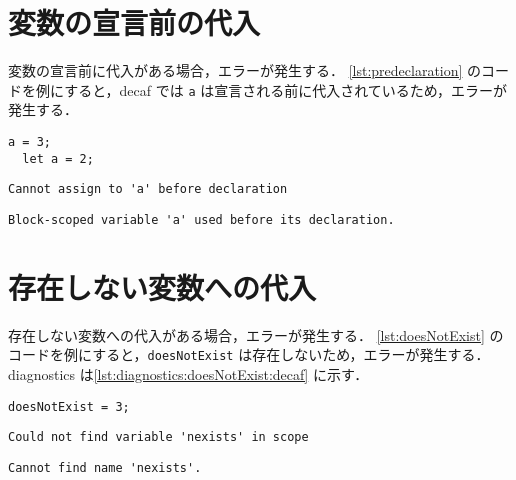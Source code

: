 \section{変数の宣言前の代入}

変数の宣言前に代入がある場合，エラーが発生する．
\ref{lst:predeclaration} のコードを例にすると，decaf では \texttt{a} は宣言される前に代入されているため，エラーが発生する．

\begin{lstlisting}[caption=変数の宣言前の代入の例, label=lst:predeclaration]
  a = 3;
  let a = 2;
\end{lstlisting}

\begin{minipage}{0.45\textwidth}
    \begin{lstlisting}[caption=decaf の diagnostics, label=lst:diagnostics:predeclaration:decaf]
    Cannot assign to 'a' before declaration
  \end{lstlisting}
\end{minipage}
\hfill
\begin{minipage}{0.45\textwidth}
    \begin{lstlisting}[caption=tsc の diagnostics, label=lst:diagnostics:predeclaration:tsc]
    Block-scoped variable 'a' used before its declaration.
  \end{lstlisting}
\end{minipage}

\section{存在しない変数への代入}

存在しない変数への代入がある場合，エラーが発生する．
\ref{lst:doesNotExist} のコードを例にすると，\texttt{doesNotExist} は存在しないため，エラーが発生する．
diagnostics は\ref{lst:diagnostics:doesNotExist:decaf} に示す．

\begin{lstlisting}[caption=存在しない変数への代入の例, label=lst:doesNotExist]
  doesNotExist = 3;
\end{lstlisting}

\begin{minipage}{0.45\textwidth}
    \begin{lstlisting}[caption=decaf の diagnostics, label=lst:diagnostics:doesNotExist:decaf]
    Could not find variable 'nexists' in scope
  \end{lstlisting}
\end{minipage}
\hfill
\begin{minipage}{0.45\textwidth}
    \begin{lstlisting}[caption=tsc の diagnostics, label=lst:diagnostics:doesNotExist:tsc]
    Cannot find name 'nexists'.
  \end{lstlisting}
\end{minipage}


